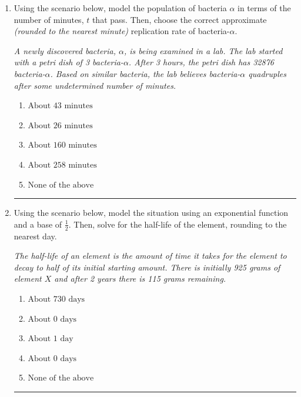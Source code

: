 \documentclass[14pt]{extbook}
\newcommand{\litem}[1]{\item#1\hspace*{-1cm}\rule{\textwidth}{0.4pt}}
\begin{document}
\begin{enumerate}
{\begin{enumerate}[label=\Alph*.]
\end{enumerate} }
\litem{
Using the scenario below, model the population of bacteria $\alpha$ in terms of the number of minutes, $t$ that pass. Then, choose the correct approximate \textit{(rounded to the nearest minute)} replication rate of bacteria-$\alpha$.
\begin{center}
    \textit{ A newly discovered bacteria, $\alpha$, is being examined in a lab. The lab started with a petri dish of 3 bacteria-$\alpha$. After 3 hours, the petri dish has 32876 bacteria-$\alpha$. Based on similar bacteria, the lab believes bacteria-$\alpha$ quadruples after some undetermined number of minutes. }
\end{center}
\begin{enumerate}[label=\Alph*.]
\item \( \text{About } 43 \text{ minutes} \)
\item \( \text{About } 26 \text{ minutes} \)
\item \( \text{About } 160 \text{ minutes} \)
\item \( \text{About } 258 \text{ minutes} \)
\item \( \text{None of the above} \)

\end{enumerate} }
\litem{
Using the scenario below, model the situation using an exponential function and a base of $\frac{1}{2}$. Then, solve for the half-life of the element, rounding to the nearest day.
\begin{center}
    \textit{ The half-life of an element is the amount of time it takes for the element to decay to half of its initial starting amount. There is initially 925 grams of element $X$ and after 2 years there is 115 grams remaining. }
\end{center}
\begin{enumerate}[label=\Alph*.]
\item \( \text{About } 730 \text{ days} \)
\item \( \text{About } 0 \text{ days} \)
\item \( \text{About } 1 \text{ day} \)
\item \( \text{About } 0 \text{ days} \)
\item \( \text{None of the above} \)


\end{enumerate}}
\end{enumerate}
\end{document}
